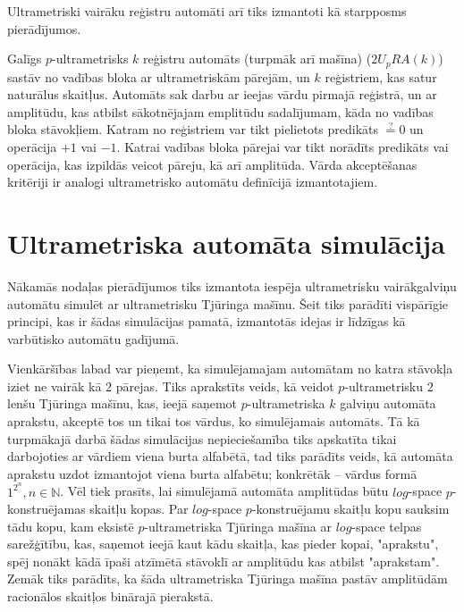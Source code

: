 \documentclass{ludis}
\begin{document}
Ultrametriski vairāku reģistru automāti arī tiks izmantoti kā starpposms pierādījumos.
\begin{definicija}
Galīgs $p$-ultrametrisks $k$ reģistru automāts (turpmāk arī mašīna) ($2U_pRA(k)$) sastāv no vadības bloka ar ultrametriskām pārejām, un $k$ reģistriem, kas satur naturālus skaitļus. Automāts sak darbu ar ieejas vārdu pirmajā reģistrā, un ar amplitūdu, kas atbilst sākotnējajam emplitūdu sadalījumam, kāda no vadības bloka stāvokļiem. Katram no reģistriem var tikt pielietots predikāts $\stackrel{?}{=} 0$ un operācija $+1$ vai $-1$. Katrai vadības bloka pārejai var tikt norādīts predikāts vai operācija, kas izpildās veicot pāreju, kā arī amplitūda. Vārda akceptēšanas kritēriji ir analogi ultrametrisko automātu definīcijā izmantotajiem.
\end{definicija}

\section{Ultrametriska automāta simulācija}
Nākamās nodaļas pierādījumos tiks izmantota iespēja ultrametrisku vairākgalviņu automātu simulēt ar ultrametrisku Tjūringa mašīnu. Šeit tiks parādīti vispārīgie principi, kas ir šādas simulācijas pamatā, izmantotās idejas ir līdzīgas kā ~\citep{Macarie1995} varbūtisko automātu gadījumā.

Vienkāršības labad var pieņemt, ka simulējamajam automātam no katra stāvokļa iziet ne vairāk kā $2$ pārejas. Tiks aprakstīts veids, kā veidot $p$-ultrametrisku $2$ lenšu Tjūringa mašīnu, kas, ieejā saņemot $p$-ultrametriska $k$ galviņu automāta aprakstu, akceptē tos un tikai tos vārdus, ko simulējamais automāts. Tā kā turpmākajā darbā šādas simulācijas nepieciešamība tiks apskatīta tikai darbojoties ar vārdiem viena burta alfabētā, tad tiks parādīts veids, kā automāta aprakstu uzdot izmantojot viena burta alfabētu; konkrētāk -- vārdus formā $1^{2^n}, n \in \mathbb{N}$. Vēl tiek prasīts, lai simulējamā automāta amplitūdas būtu $log$-space $p$-konstruējamas skaitļu kopas. Par $log$-space $p$-konstruējamu skaitļu kopu sauksim tādu kopu, kam eksistē $p$-ultrametriska Tjūringa mašīna ar $log$-space telpas sarežģītību, kas, saņemot ieejā kaut kādu skaitļa, kas pieder kopai, "aprakstu", spēj nonākt kādā īpaši atzīmētā stāvoklī ar amplitūdu kas atbilst "aprakstam". Zemāk tiks parādīts, ka šāda ultrametriska Tjūringa mašīna pastāv amplitūdām racionālos skaitļos binārajā pierakstā.
\end{document}
